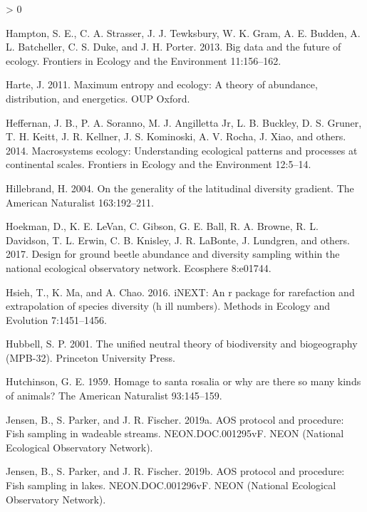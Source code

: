 \documentclass[
  12pt,
]{article}
\newlength{\cslhangindent}
\newenvironment{CSLReferences}[2] %
 {%
  \setlength{\parindent}{0pt}
  \ifodd #1 \everypar{\setlength{\hangindent}{\cslhangindent}}\ignorespaces\fi
  \ifnum #2 > 0
  \setlength{\parskip}{#2\baselineskip}
  \fi
 }%
 {}
\begin{document}
\begin{CSLReferences}{1}{0}
\leavevmode\hypertarget{ref-hampton2013big}{}%
Hampton, S. E., C. A. Strasser, J. J. Tewksbury, W. K. Gram, A. E. Budden, A. L. Batcheller, C. S. Duke, and J. H. Porter. 2013. Big data and the future of ecology. Frontiers in Ecology and the Environment 11:156--162.

\leavevmode\hypertarget{ref-harte2011maximum}{}%
Harte, J. 2011. Maximum entropy and ecology: A theory of abundance, distribution, and energetics. OUP Oxford.

\leavevmode\hypertarget{ref-heffernan2014macrosystems}{}%
Heffernan, J. B., P. A. Soranno, M. J. Angilletta Jr, L. B. Buckley, D. S. Gruner, T. H. Keitt, J. R. Kellner, J. S. Kominoski, A. V. Rocha, J. Xiao, and others. 2014. Macrosystems ecology: Understanding ecological patterns and processes at continental scales. Frontiers in Ecology and the Environment 12:5--14.

\leavevmode\hypertarget{ref-hillebrand2004generality}{}%
Hillebrand, H. 2004. On the generality of the latitudinal diversity gradient. The American Naturalist 163:192--211.

\leavevmode\hypertarget{ref-hoekman2017design}{}%
Hoekman, D., K. E. LeVan, C. Gibson, G. E. Ball, R. A. Browne, R. L. Davidson, T. L. Erwin, C. B. Knisley, J. R. LaBonte, J. Lundgren, and others. 2017. Design for ground beetle abundance and diversity sampling within the national ecological observatory network. Ecosphere 8:e01744.

\leavevmode\hypertarget{ref-hsieh2016inext}{}%
Hsieh, T., K. Ma, and A. Chao. 2016. iNEXT: An r package for rarefaction and extrapolation of species diversity (h ill numbers). Methods in Ecology and Evolution 7:1451--1456.

\leavevmode\hypertarget{ref-hubbell2001unified}{}%
Hubbell, S. P. 2001. The unified neutral theory of biodiversity and biogeography (MPB-32). Princeton University Press.

\leavevmode\hypertarget{ref-hutchinson1959homage}{}%
Hutchinson, G. E. 1959. Homage to santa rosalia or why are there so many kinds of animals? The American Naturalist 93:145--159.

\leavevmode\hypertarget{ref-Jensen2019a}{}%
Jensen, B., S. Parker, and J. R. Fischer. 2019a. AOS protocol and procedure: Fish sampling in wadeable streams. NEON.DOC.001295vF. NEON (National Ecological Observatory Network).

\leavevmode\hypertarget{ref-Jensen2019b}{}%
Jensen, B., S. Parker, and J. R. Fischer. 2019b. AOS protocol and procedure: Fish sampling in lakes. NEON.DOC.001296vF. NEON (National Ecological Observatory Network).


\end{CSLReferences}
\end{document}
